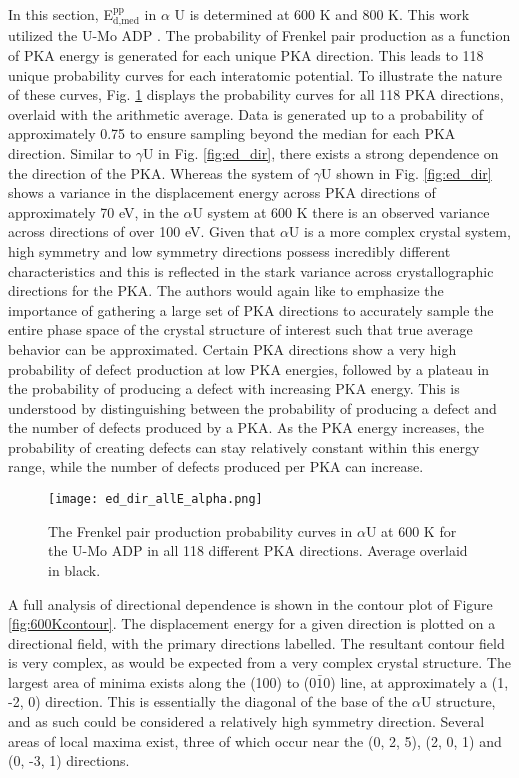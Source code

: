 \documentclass[review]{elsarticle}
\begin{document}
In this section, E$^{\textrm{pp}}_{\textrm{d,med}}$ in $\alpha$ U is determined at 600 K and 800 K. This work utilized the U-Mo ADP \cite{smirnovaADP}. The probability of Frenkel pair production as a function of PKA energy is generated for each unique PKA direction. This leads to 118 unique probability curves for each interatomic potential. To illustrate the nature of these curves, Fig. \ref{fig:ed_diralpha} displays the probability curves for all 118 PKA directions, overlaid with the arithmetic average. Data is generated up to a probability of approximately 0.75 to ensure sampling beyond the median for each PKA direction. Similar to $\gamma$U in Fig. \ref{fig:ed_dir}, there exists a strong dependence on the direction of the PKA. Whereas the system of $\gamma$U shown in Fig. \ref{fig:ed_dir} shows a variance in the displacement energy across PKA directions of approximately 70 eV, in the $\alpha$U system at 600 K there is an observed variance across directions of over 100 eV. Given that $\alpha$U is a more complex crystal system, high symmetry and low symmetry directions possess incredibly different characteristics and this is reflected in the stark variance across crystallographic directions for the PKA. The authors would again like to emphasize the importance of gathering a large set of PKA directions to accurately sample the entire phase space of the crystal structure of interest such that true average behavior can be approximated. Certain PKA directions show a very high probability of defect production at low PKA energies, followed by a plateau in the probability of producing a defect with increasing PKA energy. This is understood by distinguishing between the probability of producing a defect and the number of defects produced by a PKA. As the PKA energy increases, the probability of creating defects can stay relatively constant within this energy range, while the number of defects produced per PKA can increase. 

\begin{figure}[h]
 \centering
 \texttt{[image: ed\_dir\_allE\_alpha.png]} 
 \caption{The Frenkel pair production probability curves in $\alpha$U at 600 K for the U-Mo ADP in all 118 different PKA directions. Average overlaid in black.}
 \label{fig:ed_diralpha}
\end{figure}

\FloatBarrier

A full analysis of directional dependence is shown in the contour plot of Figure \ref{fig:600Kcontour}. The displacement energy for a given direction is plotted on a directional field, with the primary directions labelled. The resultant contour field is very complex, as would be expected from a very complex crystal structure. The largest area of minima exists along the (100) to (0$\bar{1}$0) line, at approximately a (1, -2, 0) direction. This is essentially the diagonal of the base of the $\alpha$U structure, and as such could be considered a relatively high symmetry direction. Several areas of local maxima exist, three of which occur near the (0, 2, 5), (2, 0, 1) and (0, -3, 1) directions. 
\end{document}
